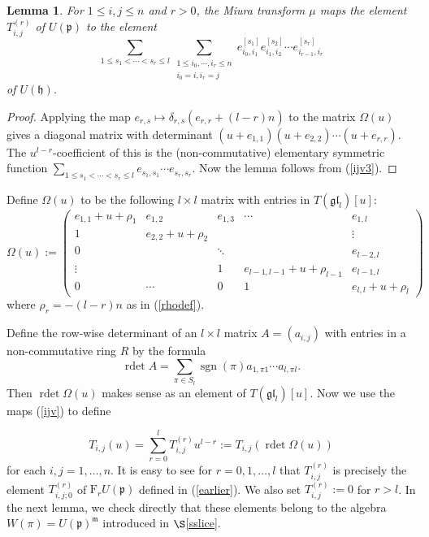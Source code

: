 \documentclass[twoside,12pt,reqno]{amsart}
\makeatletter
\newif\ifcenters@
\newtheorem{Lemma}[Proposition]{Lemma}
\def\rdet{\operatorname{rdet}}
\def\F{\mathrm{F}}
\def\sgn{{\operatorname{sgn}}}
\makeatother
\begin{document}
\begin{Lemma}\label{mim}
For $1 \leq i,j \leq n$ and $r > 0$, the Miura transform 
$\mu$ maps the element
$T_{i,j}^{(r)}$ of $U(\mathfrak{p})$ to the element
\begin{equation}\label{miuraimage}
\sum_{1 \leq s_1 < \cdots < s_r \leq l}
\sum_{\substack{1 \leq i_0,\cdots,i_r \leq n \\ i_0 = i, i_r = j}}
e_{i_0,i_1}^{[s_1]}
e_{i_1,i_2}^{[s_2]}
\cdots
e_{i_{r-1},i_r}^{[s_r]}
\end{equation}
of $U(\mathfrak{h})$.
\end{Lemma}

\begin{proof}
Applying the map $e_{r,s} \mapsto \delta_{r,s} (e_{r,r} + (l-r)n)$
to the matrix $\Omega(u)$ gives a diagonal matrix with
determinant $(u+e_{1,1}) (u+e_{2,2}) \cdots (u+e_{r,r})$.
The $u^{l-r}$-coefficient of this is the (non-commutative)
elementary symmetric function
$\sum_{1 \leq s_1 < \cdots < s_r \leq l} 
e_{s_1,s_1}
\cdots e_{s_r,s_r}$.
Now the lemma follows from (\ref{ijv3}).
\end{proof}
\fi

Define $\Omega(u)$
to be the following $l \times l$ matrix 
with entries in $T(\mathfrak{gl}_l)[u]$:
\begin{equation*}
\Omega(u) := \left(
\begin{array}{cccccc}
e_{1,1}+u+\rho_1 & e_{1,2} & e_{1,3}&\cdots & e_{1,l}\\
1&e_{2,2}+u+\rho_2&&&\vdots\\
0&&\ddots&&e_{l-2,l}\\
\vdots&&1&e_{l-1,l-1} +u+\rho_{l-1}&e_{l-1,l}\\
0&\cdots&0&1&e_{l,l}  +u+\rho_l
\end{array}
\right)
\end{equation*}
where $\rho_r = -(l-r)n$ as in (\ref{rhodef}).
\ifcenters@
This matrix should be compared with
(\ref{znr}).
Recalling the definitions (\ref{detdefr}) and (\ref{ijv}), define 
\else
Define the row-wise determinant of an $l \times l$ matrix $A = (a_{i,j})$ 
with entries in a non-commutative ring $R$ by the formula
\begin{equation}\label{detdefr}
\rdet A  = \sum_{\pi \in S_l} \sgn(\pi) a_{1,\pi
1} \cdots a_{l,\pi l}.
\end{equation}
Then $\rdet \Omega(u)$ makes sense as an element of 
$T(\mathfrak{gl}_l)[u]$.
Now we use the maps (\ref{ijv}) to
define 
\fi
\begin{equation}
T_{i,j}(u) = \sum_{r = 0}^l T_{i,j}^{(r)} u^{l-r}
:= T_{i,j}(\rdet \Omega(u))
\end{equation}
for each $i,j=1,\dots,n$.
It is easy to see for $r = 0,1,\dots,l$ that
$T_{i,j}^{(r)}$ is precisely the element
$T_{i,j;0}^{(r)}$ of $\F_r U(\mathfrak{p})$ defined in (\ref{earlier}).
We also set $T_{i,j}^{(r)} := 0$ for $r > l$.
In the next lemma, we 
check directly that these elements 
belong to the algebra $W(\pi)= U(\mathfrak{p})^{\mathfrak{m}}$
introduced in $\S$\ref{sslice}.
\end{document}
